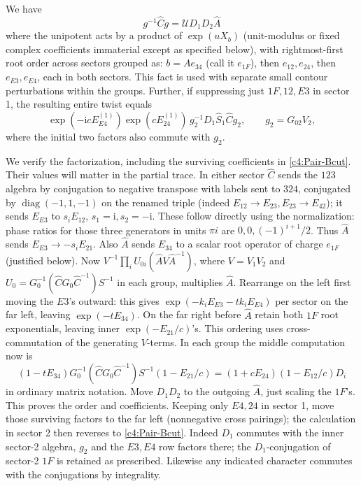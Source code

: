 We have
\[
 g^{-1}\widehat Cg=\mathcal U D_1D_2\widehat A
\]
where the unipotent acts by a product of \(\exp(u X_b)\) (unit-modulus or fixed complex coefficients immaterial except as specified below), with rightmost-first root order across sectors grouped as: \(b=A e_{34}\) (call it \(e_{1F}\)), then \(e_{12}, e_{24}\), then \(e_{E3},e_{E4}\), each in both sectors. This fact is used with separate small contour perturbations within the groups. Further, if suppressing just \(1F,12,E3\) in sector 1, the resulting entire twist equals
\begin{equation}
 \exp(-\mathrm{i}c E_{E4}^{(1)})\exp(c E_{24}^{(1)})\,
     g_2^{-1}D_1\widehat S_1\widehat C g_2,\qquad g_2=G_{02}V_2,                    \label{c4:Pair-Bcut}
\end{equation}
where the initial two factors also commute with \(g_2\).

We verify the factorization, including the surviving coefficients in
\eqref{c4:Pair-Bcut}.  Their values will matter in the partial trace. In either sector \(\widehat C\) sends the \(123\) algebra by conjugation to negative transpose with labels sent to \(324\), conjugated by \(\operatorname{diag}(-1,1,-1)\) on the renamed triple (indeed \(E_{12}\to E_{23}, E_{23}\to E_{42}\)); it sends \(E_{E3}\) to \(s_i E_{12}\), \(s_1=\mathrm{i},s_2=-\mathrm{i}\). These follow directly using the normalization: phase ratios for those three generators in units \(\pi i\) are \(0,0,(-1)^{i+1}/2\). Thus \(\widehat A\) sends \(E_{E3}\to-s_i E_{21}\). Also \(\widehat A\) sends \(E_{34}\) to a scalar root operator of charge \(e_{1F}\) (justified below). Now \(V^{-1}\prod_i U_{0i}(\widehat A V\widehat A^{-1})\), where \(V=V_1V_2\) and \(U_0=G_0^{-1}(\widehat C G_0\widehat C^{-1}) S^{-1}\) in each group, multiplies \(\widehat A\). Rearrange on the left first moving the \(E3\)'s outward: this gives \(\exp(-k_i E_{E3}-t k_i E_{E4})\) per sector on the far left, leaving \(\exp(-t E_{34})\). On the far right before \(\widehat A\) retain both \(1F\) root exponentials, leaving inner \(\exp(-E_{21}/c)\)'s. This ordering uses cross-commutation of the generating \(V\)-terms. In each group the middle computation now is
\[
 (1-t E_{34})G_0^{-1}(\widehat C G_0\widehat C^{-1}) S^{-1}
 (1-E_{21}/c)=(1+cE_{24})(1-E_{12}/c)D_i
\]
in ordinary matrix notation. Move \(D_1D_2\) to the outgoing \(\widehat A\), just scaling the \(1F\)'s. This proves the order and coefficients. Keeping only \(E4,24\) in sector 1, move those surviving factors to the far left (nonnegative cross pairings); the calculation in sector 2 then reverses to \eqref{c4:Pair-Bcut}. Indeed \(D_1\) commutes with the inner sector-2 algebra, \(g_2\) and the \(E3,E4\) row factors there; the \(D_1\)-conjugation of sector-2 \(1F\) is retained as prescribed. Likewise any indicated character commutes with the conjugations by integrality.

